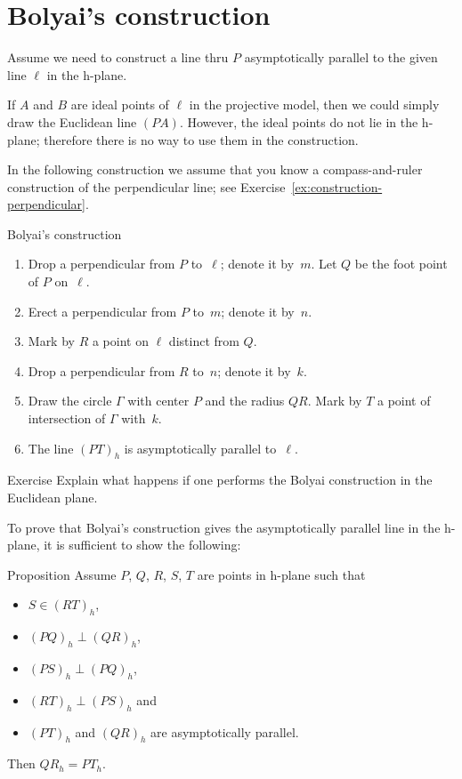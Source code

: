 \section*{Bolyai's construction}

Assume we need to construct a line thru $P$ asymptotically parallel to the given line $\ell$ in the h-plane.

If $A$ and $B$ are ideal points of $\ell$ in the projective model, 
then we could simply draw the Euclidean line $(PA)$.
However, the ideal points do not lie in the h-plane; therefore there is no way to use them in the construction.

In the following construction we assume that you know a compass-and-ruler construction of the perpendicular line; see Exercise~\ref{ex:construction-perpendicular}.
\clearpage

\begin{thm}{Bolyai's construction}
\begin{enumerate}
\item Drop a perpendicular from $P$ to~$\ell$; denote it by~$m$.
Let $Q$ be the foot point of $P$ on~$\ell$.
\item Erect a perpendicular from $P$ to~$m$; denote it by~$n$.
\item Mark by $R$ a point on $\ell$ distinct from $Q$.
\item Drop a perpendicular from $R$ to~$n$; denote it by~$k$. 
\item Draw the circle $\Gamma$ with center $P$ and the radius $QR$. 
Mark by $T$ a point of intersection of $\Gamma$ with~$k$.
\item The line $(PT)_h$ is asymptotically parallel to~$\ell$.
\end{enumerate}
\end{thm}

\begin{thm}{Exercise}\label{ex:Boyai-in-Euclid}
Explain what happens if one performs the Bolyai construction in the Euclidean plane.
\end{thm}

To prove that Bolyai's construction gives the asymptotically parallel line in the h-plane,
it is sufficient to show the following:

\begin{thm}{Proposition}\label{prop:boyai}
Assume $P$, $Q$, $R$, $S$, $T$ are points in h-plane
such that 
\begin{itemize}
\item $S\in (RT)_h$,
\item $(PQ)_h\perp (QR)_h$,
\item $(PS)_h\perp(PQ)_h$,
\item $(RT)_h\perp (PS)_h$ and 
\item $(PT)_h$ and $(QR)_h$ are asymptotically parallel.
\end{itemize}
Then $QR_h=PT_h$.
\end{thm}


